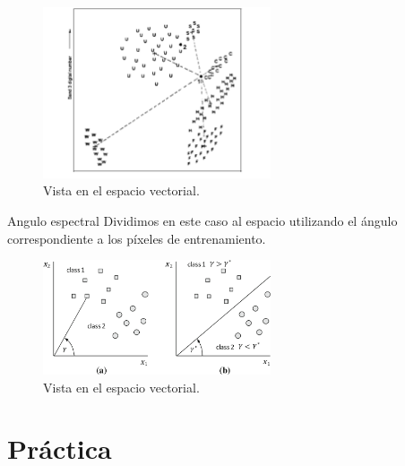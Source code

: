 \documentclass[]{beamer}
\begin{document}
\begin{frame}{\subsecname}
  \begin{figure}
  \includegraphics[width=0.6\textwidth]{imagenes/min.png}
  \caption{Vista en el espacio vectorial.}
  \end{figure}
\end{frame}

\begin{frame}{\subsecname}
  \begin{block}{Angulo espectral}
    Dividimos en este caso al espacio utilizando el ángulo correspondiente a los píxeles de entrenamiento.
  \end{block}
\end{frame}

\begin{frame}{\subsecname}
  \begin{figure}
  \includegraphics[width=0.6\textwidth]{imagenes/angle.png}
  \caption{Vista en el espacio vectorial.}
  \end{figure}
\end{frame}

\section{Práctica}
\end{document}
